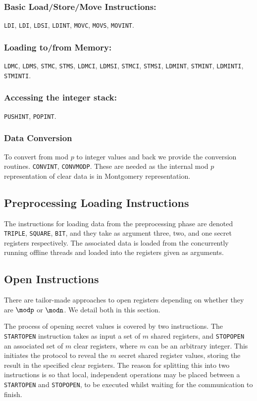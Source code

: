\subsubsection{Basic Load/Store/Move Instructions:}
\verb+LDI+,
\verb+LDI+,
\verb+LDSI+,
\verb+LDINT+,
\verb+MOVC+,
\verb+MOVS+,
\verb+MOVINT+.

\subsubsection{Loading to/from Memory:}
 \verb+LDMC+,
 \verb+LDMS+,
 \verb+STMC+,
 \verb+STMS+,
 \verb+LDMCI+,
 \verb+LDMSI+,
 \verb+STMCI+,
 \verb+STMSI+,
 \verb+LDMINT+, 
 \verb+STMINT+,
 \verb+LDMINTI+,
 \verb+STMINTI+.

\subsubsection{Accessing the integer stack:}
\verb+PUSHINT+, \verb+POPINT+.

\subsubsection{Data Conversion}
To convert from mod $p$ to integer values and
back we provide the conversion routines.
\verb+CONVINT+, \verb+CONVMODP+.
These are needed as the internal mod $p$ representation
of clear data is in Montgomery representation.

\subsection{Preprocessing Loading Instructions}
The instructions for loading data from the preprocessing phase
are denoted \verb+TRIPLE+, \verb+SQUARE+, \verb+BIT+,
and they take as argument three, two, and one secret registers 
respectively.
The associated data is loaded from the concurrently running
offline threads and loaded into the registers given as arguments.

\subsection{Open Instructions}
There are tailor-made approaches to open registers depending on whether they are $\modp$ or $\modn$. We detail both in this section. 

The process of opening secret values is covered by two instructions.
The \verb+STARTOPEN+ instruction takes as input a set of $m$
shared registers, and \verb+STOPOPEN+ an associated set of $m$
clear registers, where $m$ can be an arbitrary integer.
This initiates the protocol to reveal the $m$ secret shared register values,
storing the result in the specified clear registers. The reason for
splitting this into two instructions is so that local, independent
operations may be placed between a \verb+STARTOPEN+ and \verb+STOPOPEN+,
to be executed whilst waiting for the communication to finish.

